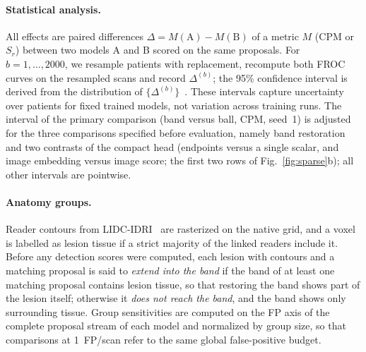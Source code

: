 \paragraph{Statistical analysis.} All effects are paired differences $\Delta=M(\text{A})-M(\text{B})$ of a metric $M$ (CPM or $S_r$) between two models A and B scored on the same proposals. For $b=1,\dots,2000$, we resample patients with replacement, recompute both FROC curves on the resampled scans and record $\Delta^{(b)}$; the 95\% confidence interval is derived from the distribution of $\{\Delta^{(b)}\}$~\cite{efron1993bootstrap}. These intervals capture uncertainty over patients for fixed trained models, not variation across training runs. The interval of the primary comparison (band versus ball, CPM, seed~1) is adjusted for the three comparisons specified before evaluation, namely band restoration and two contrasts of the compact head (endpoints versus a single scalar, and image embedding versus image score; the first two rows of Fig.~\ref{fig:sparse}b); all other intervals are pointwise.

\paragraph{Anatomy groups.} Reader contours from LIDC-IDRI~\cite{armato2011lidc,fedorov2020lidc} are rasterized on the native grid, and a voxel is labelled as lesion tissue if a strict majority of the linked readers include it. Before any detection scores were computed, each lesion with contours and a matching proposal is said to \emph{extend into the band} if the band of at least one matching proposal contains lesion tissue, so that restoring the band shows part of the lesion itself; otherwise it \emph{does not reach the band}, and the band shows only surrounding tissue. Group sensitivities are computed on the FP axis of the complete proposal stream of each model and normalized by group size, so that comparisons at 1~FP/scan refer to the same global false-positive budget.
